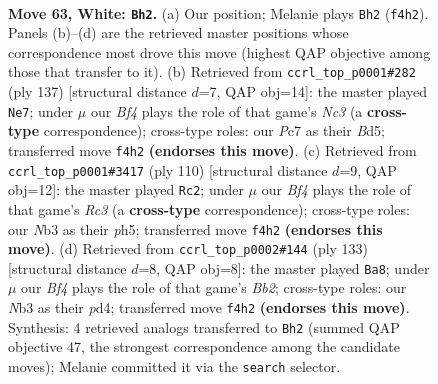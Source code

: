 \documentclass[11pt]{article}
\begin{document}
\clearpage

\begin{figure}[p]\centering
\begin{subfigure}{0.46\textwidth}\centering
\resizebox{\linewidth}{!}{%
\newchessgame
\chessboard[
  setfen={6k1/2P5/2r5/8/5B2/1N6/4K3/8 w - - 39 63},
  showmover=false,
  pgfstyle=straightmove, color=movearrow, markmove={f4-h2}
]}
\caption{}
\end{subfigure}\hfill
\begin{subfigure}{0.46\textwidth}\centering
\resizebox{\linewidth}{!}{%
\newchessgame
\chessboard[
  setfen={8/7k/2n5/1R1b4/8/1p6/5K2/8 b - - 11 69},
  showmover=false,
  pgfstyle=straightmove, color=movearrow, markmove={c6-e7}
]}
\caption{}
\end{subfigure}
\\[4pt]
\begin{subfigure}{0.46\textwidth}\centering
\resizebox{\linewidth}{!}{%
\newchessgame
\chessboard[
  setfen={8/7k/8/4K2p/8/1PR5/8/1r6 w - - 3 56},
  showmover=false,
  pgfstyle=straightmove, color=movearrow, markmove={c3-c2}
]}
\caption{}
\end{subfigure}\hfill
\begin{subfigure}{0.46\textwidth}\centering
\resizebox{\linewidth}{!}{%
\newchessgame
\chessboard[
  setfen={8/1b6/8/6R1/1k1P4/8/5Kp1/8 b - - 16 67},
  showmover=false,
  pgfstyle=straightmove, color=movearrow, markmove={b7-a8}
]}
\caption{}
\end{subfigure}
\caption{\textbf{Move 63, White: \texttt{Bh2}.} (a) Our position; Melanie plays \texttt{Bh2} (\texttt{f4h2}). Panels (b)--(d) are the retrieved master positions whose correspondence most drove this move (highest QAP objective among those that transfer to it). (b) Retrieved from \texttt{ccrl\_top\_p0001\#282} (ply 137) [structural distance $d$=7, QAP obj=14]: the master played \texttt{Ne7}; under $\mu$ our \emph{Bf4} plays the role of that game's \emph{Nc3} (a \textbf{cross-type} correspondence); cross-type roles: our \emph{P}c7 as their \emph{B}d5; transferred move \texttt{f4h2} \textbf{(endorses this move)}. (c) Retrieved from \texttt{ccrl\_top\_p0001\#3417} (ply 110) [structural distance $d$=9, QAP obj=12]: the master played \texttt{Rc2}; under $\mu$ our \emph{Bf4} plays the role of that game's \emph{Rc3} (a \textbf{cross-type} correspondence); cross-type roles: our \emph{N}b3 as their \emph{p}h5; transferred move \texttt{f4h2} \textbf{(endorses this move)}. (d) Retrieved from \texttt{ccrl\_top\_p0002\#144} (ply 133) [structural distance $d$=8, QAP obj=8]: the master played \texttt{Ba8}; under $\mu$ our \emph{Bf4} plays the role of that game's \emph{Bb2}; cross-type roles: our \emph{N}b3 as their \emph{p}d4; transferred move \texttt{f4h2} \textbf{(endorses this move)}. Synthesis: 4 retrieved analogs transferred to \texttt{Bh2} (summed QAP objective 47, the strongest correspondence among the candidate moves); Melanie committed it via the \texttt{search} selector.}
\label{fig:thought-m124}
\end{figure}
\end{document}

